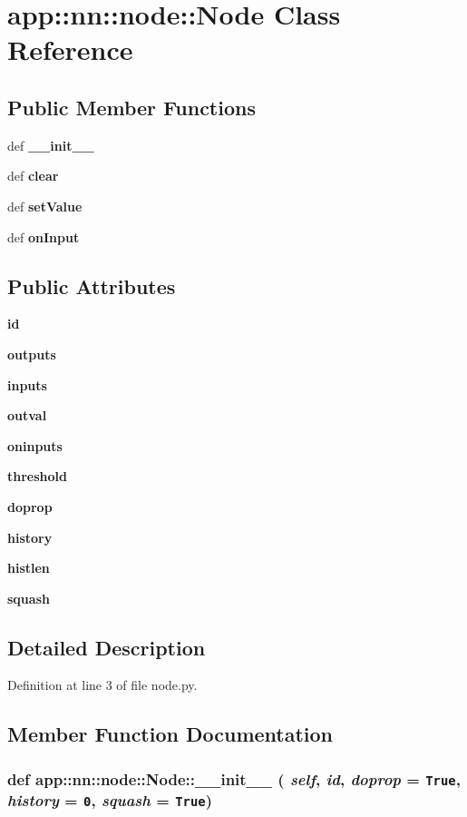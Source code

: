 \section{app::nn::node::Node Class Reference}
\label{classapp_1_1nn_1_1node_1_1Node}
\subsection*{Public Member Functions}
\begin{CompactItemize}
\item 
def {\bf \_\-\_\-init\_\-\_\-}
\item 
def {\bf clear}
\item 
def {\bf setValue}
\item 
def {\bf onInput}
\end{CompactItemize}
\subsection*{Public Attributes}
\begin{CompactItemize}
\item 
{\bf id}
\item 
{\bf outputs}
\item 
{\bf inputs}
\item 
{\bf outval}
\item 
{\bf oninputs}
\item 
{\bf threshold}
\item 
{\bf doprop}
\item 
{\bf history}
\item 
{\bf histlen}
\item 
{\bf squash}
\end{CompactItemize}


\subsection{Detailed Description}


Definition at line 3 of file node.py.

\subsection{Member Function Documentation}
\subsubsection{\setlength{\rightskip}{0pt plus 5cm}def app::nn::node::Node::\_\-\_\-init\_\-\_\- ( {\em self},  {\em id},  {\em doprop} = {\tt True},  {\em history} = {\tt 0},  {\em squash} = {\tt True})}\label{classapp_1_1nn_1_1node_1_1Node_c0e080f85793295b2305d17de3ed239b}




